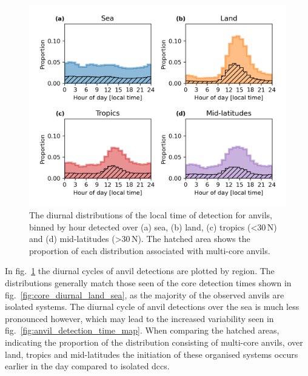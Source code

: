 \begin{figure}[tp]
    \centering
    \includegraphics[width=\textwidth]{figures/chapter2_24.png}
    \caption[
    The diurnal distributions of the local time of detection for anvils detected over sea, land, tropics and mid-latitudes
    ]{
    The diurnal distributions of the local time of detection for anvils, binned by hour detected over (a) sea, (b) land, (c) tropics (\textless 30\,\textdegree N) and (d) mid-latitudes (\textgreater 30\,\textdegree N). The hatched area shows the proportion of each distribution associated with multi-core anvils.
    }
    \label{fig:anvil_diurnal_distributions}
\end{figure}

In fig.~\ref{fig:anvil_diurnal_distributions} the diurnal cycles of anvil detections are plotted by region.
The distributions generally match those seen of the core detection times shown in fig.~\ref{fig:core_diurnal_land_sea}, as the majority of the observed anvils are isolated systems.
The diurnal cycle of anvil detections over the sea is much less pronounced however, which may lead to the increased variability seen in fig.~\ref{fig:anvil_detection_time_map}.
When comparing the hatched areas, indicating the proportion of the distribution consisting of multi-core anvils, over land, tropics and mid-latitudes the initiation of these organised systems occurs earlier in the day compared to isolated \acrshort{dcc}s.

